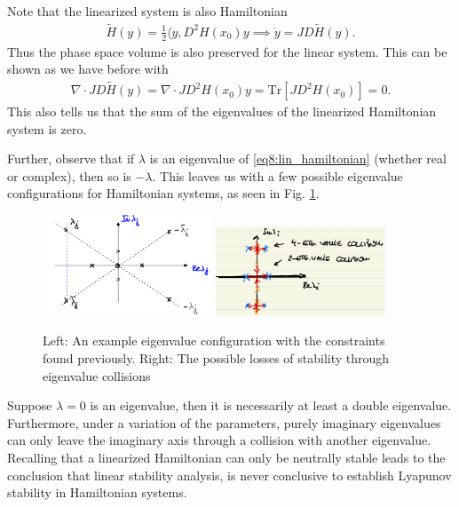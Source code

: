 Note that the linearized system is also Hamiltonian
\begin{align}
	\tilde{H}(y) = \frac{1}{2} \langle y, D^{2}H(x_0)y \implies \dot{y} = JD\tilde{H}(y).
\end{align}
Thus the phase space volume is also preserved for the linear system. This can be shown as we have before with
\begin{align}
	\nabla \cdot JD\tilde{H}(y) =  \nabla \cdot JD^2H(x_0) y =  \textrm{Tr} [JD^2H(x_0)] = 0.
\end{align}
This also tells us that the sum of the eigenvalues of the linearized Hamiltonian system is zero.

Further, observe that if $\lambda $ is an eigenvalue of \eqref{eq8:lin_hamiltonian} (whether real or complex), then so is $- \lambda $. This leaves us with a few possible eigenvalue configurations for Hamiltonian systems, as seen in Fig. \ref{fig:new_eigv_configs}.
\begin{figure}[h!]
	\centering
	\includegraphics[width=0.45\textwidth]{figures/ch8/16new_eigv_config.png}
	\includegraphics[width=0.45\textwidth]{figures/ch8/16_eigv_collision.png}
	\caption{Left: An example eigenvalue configuration with the constraints found previously. Right: The possible losses of stability through eigenvalue collisions}
	\label{fig:new_eigv_configs}
\end{figure}

Suppose $\lambda=0$ is an eigenvalue, then it is necessarily at least a double eigenvalue. Furthermore, under a variation of the parameters, purely imaginary eigenvalues can only leave the imaginary axis through a collision with another eigenvalue. 
Recalling that a linearized Hamiltonian can only be neutrally stable leads to the conclusion that linear stability analysis, is never conclusive to establish Lyapunov stability  in Hamiltonian systems. 

